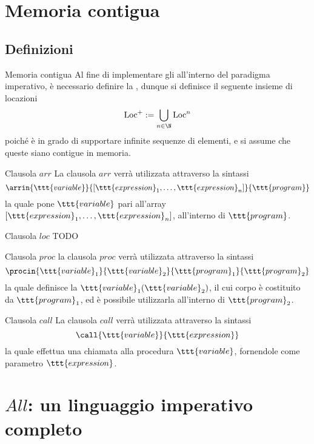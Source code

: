 \documentclass[a4paper, 12pt]{report}
\begin{document}
    \section{Memoria contigua}

    \subsection{Definizioni}

    \begin{frameddefn}{Memoria contigua}
        Al fine di implementare gli  all'interno del paradigma imperativo, è necessario definire la , dunque si definisce il seguente insieme di locazioni $$\displaystyle \mathrm{Loc}^+ := \bigcup_{n \in \N}{\mathrm{Loc}^n}$$ poiché è in grado di supportare infinite sequenze di elementi, e si assume che queste siano contigue in memoria.
    \end{frameddefn}

    \begin{frameddefn}{Clausola $arr$}
        La clausola $arr$ verrà utilizzata attraverso la sintassi $$\arrin{\ttt{variable}}{[\ttt{expression}_1, \ldots, \ttt{expression}_n]}{\ttt{program}}$$ la quale pone $\ttt{variable}$ pari all'array $[\ttt{expression}_1, \ldots, \ttt{expression}_n]$, all'interno di $\ttt{program}$.
    \end{frameddefn}

    \begin{frameddefn}{Clausola $loc$}
        TODO
    \end{frameddefn}

    \begin{frameddefn}{Clausola $proc$}
        la clausola $proc$ verrà utilizzata attraverso la sintassi $$\procin{\ttt{variable}_1}{\ttt{variable}_2}{\ttt{program}_1}{\ttt{program}_2}$$ la quale definisce la  $\ttt{variable}_1(\ttt{variable}_2)$, il cui corpo è costituito da $\ttt{program}_1$, ed è possibile utilizzarla all'interno di $\ttt{program}_2$.
    \end{frameddefn}

    \begin{frameddefn}{Clausola $call$}
        La clausola $call$ verrà utilizzata attraverso la sintassi $$\call{\ttt{variable}}{\ttt{expression}}$$ la quale effettua una chiamata alla procedura $\ttt{variable}$, fornendole come parametro $\ttt{expression}$.
    \end{frameddefn}

    \section{$All$: un linguaggio imperativo completo}
\end{document}
